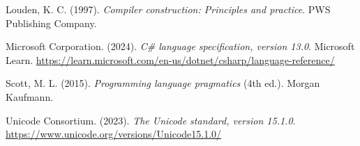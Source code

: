 \documentclass[12pt,a4paper]{report}
\begin{document}
Louden, K. C. (1997). \textit{Compiler construction: Principles and practice}. PWS Publishing Company.

\vspace{0.3cm}

Microsoft Corporation. (2024). \textit{C\# language specification, version 13.0}. Microsoft Learn. \url{https://learn.microsoft.com/en-us/dotnet/csharp/language-reference/}

\vspace{0.3cm}

Scott, M. L. (2015). \textit{Programming language pragmatics} (4th ed.). Morgan Kaufmann.

\vspace{0.3cm}

Unicode Consortium. (2023). \textit{The Unicode standard, version 15.1.0}. \url{https://www.unicode.org/versions/Unicode15.1.0/}

\setlength{\leftskip}{0cm}
\setlength{\parindent}{0cm}
\end{document}
